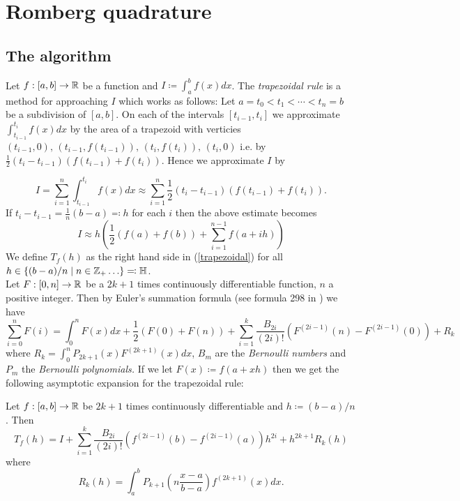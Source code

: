 \chapter{Romberg quadrature}

\section{The algorithm}

Let \(f:[a,b] \rightarrow \mathbb{R}\) be a function and \(I\coloneqq \int_a^bf(x)dx\). The {\it trapezoidal rule} is a method for approaching \(I\) which works as follows: Let \(a = t_0 < t_1 < \cdots < t_n = b\) be a subdivision of \([a,b]\). On each of the intervals \([t_{i-1},t_i]\) we approximate \(\int_{t_{i-1}}^{t_i}f(x)dx\) by the area of a trapezoid with verticies \((t_{i-1},0),\,(t_{i-1}, f(t_{i-1})),\,(t_i,f(t_i)),\, (t_i,0)\) i.e. by \(\frac{1}{2}(t_i - t_{i-1})(f(t_{i-1}) + f(t_i))\). Hence we approximate \(I\) by 

\[
I = \sum_{i=1}^n \int_{t_{i-1}}^{t_i}f(x)dx \approx \sum_{i=1}^n\frac{1}{2}(t_i - t_{i-1})(f(t_{i-1}) + f(t_i)).
\]
If \(t_i - t_{i-1} = \frac{1}{n}(b-a)\eqqcolon h\) for each \(i\) then the above estimate becomes
\begin{equation}\label{trapezoidal}
I \approx h \left(\frac{1}{2}(f(a) + f(b)) + \sum_{i=1}^{n-1}f(a + ih)\right)
\end{equation}
We define \(T_f(h)\) as the right hand side in (\ref{trapezoidal}) for all \(h\in \{(b-a)/n\mid n \in \mathbb{Z}_+\ldots\}\eqqcolon \mathbb{H}\).\\

Let \(F:[0, n]\rightarrow \mathbb{R}\) be a \(2k+1\) times continuously differentiable function, \(n\) a positive integer. Then by Euler's summation formula (see formula 298 in \cite{kn}) we have
\begin{equation}
\sum_{i=0}^nF(i) = \int_0^nF(x)dx + \frac{1}{2}(F(0) + F(n)) + \sum_{i=1}^k\frac{B_{2i}}{(2i)!}(F^{(2i-1)}(n) - F^{(2i-1)}(0)) + R_k
\end{equation}
where \(R_k = \int_0^nP_{2k+1}(x)F^{(2k+1)}(x)dx\), \(B_m\) are the {\it Bernoulli numbers} and \(P_m\) the {\it Bernoulli polynomials.} If we let \(F(x)\coloneqq f(a + xh)\) then we get the following asymptotic expansion for the trapezoidal rule:

\begin{theorem}
Let \(f:[a,b] \rightarrow \mathbb{R}\) be \(2k+1\) times continuously differentiable and \(h \coloneqq (b-a)/n\). Then 
\begin{equation}
T_f(h) = I + \sum_{i=1}^k\frac{B_{2i}}{(2i)!}(f^{(2i-1)}(b) - f^{(2i-1)}(a))h^{2i} + h^{2k+1}R_k(h)
\end{equation}
where
\begin{equation}
R_k(h) = \int_a^bP_{k+1}\left(n\frac{x-a}{b-a}\right)f^{(2k+1)}(x)dx. 
\end{equation}
\end{theorem}

